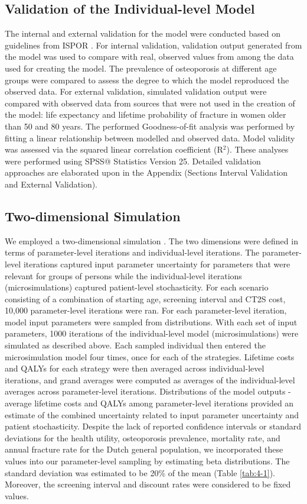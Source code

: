 \subsection{Validation of the Individual-level Model}

The internal and external validation for the model were conducted based on guidelines from ISPOR \cite{4-24}. For internal validation, validation output generated from the model was used to compare with real, observed values from among the data used for creating the model. The prevalence of osteoporosis at different age groups were compared to assess the degree to which the model reproduced the observed data. For external validation, simulated validation output were compared with observed data from sources that were not used in the creation of the model: life expectancy and lifetime probability of fracture in women older than 50 and 80 years. The performed Goodness-of-fit analysis was performed by fitting a linear relationship between modelled and observed data. Model validity was assessed via the squared linear correlation coefficient (R$^2$). These analyses were performed using SPSS@ Statistics Version 25. Detailed validation approaches are elaborated upon in the Appendix (Sections Interval Validation and External Validation).

\subsection{Two-dimensional Simulation}

We employed a two-dimensional simulation \cite{4-25}. The two dimensions were defined in terms of parameter-level iterations and individual-level iterations. The parameter-level iterations captured input parameter uncertainty for parameters that were relevant for groups of persons while the individual-level iterations (microsimulations) captured patient-level stochasticity. For each scenario consisting of a combination of starting age, screening interval and CT2S cost, 10,000 parameter-level iterations were ran. For each parameter-level iteration, model input parameters were sampled from distributions. With each set of input parameters, 1000 iterations of the individual-level model (microsimulations) were simulated as described above. Each sampled individual then entered the microsimulation model four times, once for each of the strategies. Lifetime costs and QALYs for each strategy were then averaged across individual-level iterations, and grand averages were computed as averages of the individual-level averages across parameter-level iterations. Distributions of the model outputs - average lifetime costs and QALYs among parameter-level iterations provided an estimate of the combined uncertainty related to input parameter uncertainty and patient stochasticity. Despite the lack of reported confidence intervals or standard deviations for the health utility, osteoporosis prevalence, mortality rate, and annual fracture rate for the Dutch general population, we incorporated these values into our parameter-level sampling by estimating beta distributions. The standard deviation was estimated to be 20\% of the mean (Table \ref{tab:4-1}).  Moreover, the screening interval and discount rates were considered to be fixed values.

